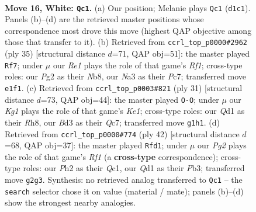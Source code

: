 \documentclass[11pt]{article}
\begin{document}
\clearpage

\begin{figure}[p]\centering
\begin{subfigure}{0.46\textwidth}\centering
\resizebox{\linewidth}{!}{%
\newchessgame
\chessboard[
  setfen={r5k1/pp2r1pp/2nbpq2/3p4/8/N2B4/PPP2PPP/R2QR1K1 w - - 0 16},
  showmover=false,
  pgfstyle=straightmove, color=movearrow, markmove={d1-c1}
]}
\caption{}
\end{subfigure}\hfill
\begin{subfigure}{0.46\textwidth}\centering
\resizebox{\linewidth}{!}{%
\newchessgame
\chessboard[
  setfen={rn2qrk1/2p3bp/1p4p1/p2N4/3Pp3/1PB3P1/P3QP1P/R4RK1 b - - 0 18},
  showmover=false,
  pgfstyle=straightmove, color=movearrow, markmove={f8-f7}
]}
\caption{}
\end{subfigure}
\\[4pt]
\begin{subfigure}{0.46\textwidth}\centering
\resizebox{\linewidth}{!}{%
\newchessgame
\chessboard[
  setfen={1r2k2r/p1q2ppp/2p1pb2/8/2Q5/1PN3P1/P3PP1P/R4RK1 b k - 0 16},
  showmover=false,
  pgfstyle=straightmove, color=movearrow, markmove={e8-g8}
]}
\caption{}
\end{subfigure}\hfill
\begin{subfigure}{0.46\textwidth}\centering
\resizebox{\linewidth}{!}{%
\newchessgame
\chessboard[
  setfen={4r1k1/ppp2r1p/2qn2pB/3pb3/8/1PPR2NP/P4PP1/2Q2RK1 w - - 5 22},
  showmover=false,
  pgfstyle=straightmove, color=movearrow, markmove={f1-d1}
]}
\caption{}
\end{subfigure}
\caption{\textbf{Move 16, White: \texttt{Qc1}.} (a) Our position; Melanie plays \texttt{Qc1} (\texttt{d1c1}). Panels (b)--(d) are the retrieved master positions whose correspondence most drove this move (highest QAP objective among those that transfer to it). (b) Retrieved from \texttt{ccrl\_top\_p0000\#2962} (ply 35) [structural distance $d$=71, QAP obj=51]: the master played \texttt{Rf7}; under $\mu$ our \emph{Re1} plays the role of that game's \emph{Rf1}; cross-type roles: our \emph{P}g2 as their \emph{N}b8, our \emph{N}a3 as their \emph{P}c7; transferred move \texttt{e1f1}. (c) Retrieved from \texttt{ccrl\_top\_p0003\#821} (ply 31) [structural distance $d$=73, QAP obj=44]: the master played \texttt{O-O}; under $\mu$ our \emph{Kg1} plays the role of that game's \emph{Ke1}; cross-type roles: our \emph{Q}d1 as their \emph{R}h8, our \emph{B}d3 as their \emph{Q}c7; transferred move \texttt{g1h1}. (d) Retrieved from \texttt{ccrl\_top\_p0000\#774} (ply 42) [structural distance $d$=68, QAP obj=37]: the master played \texttt{Rfd1}; under $\mu$ our \emph{Pg2} plays the role of that game's \emph{Rf1} (a \textbf{cross-type} correspondence); cross-type roles: our \emph{P}h2 as their \emph{Q}c1, our \emph{Q}d1 as their \emph{P}b3; transferred move \texttt{g2g3}. Synthesis: no retrieved analog transferred to \texttt{Qc1} -- the \texttt{search} selector chose it on value (material / mate); panels (b)--(d) show the strongest nearby analogies.}
\label{fig:thought-m30}
\end{figure}
\end{document}
